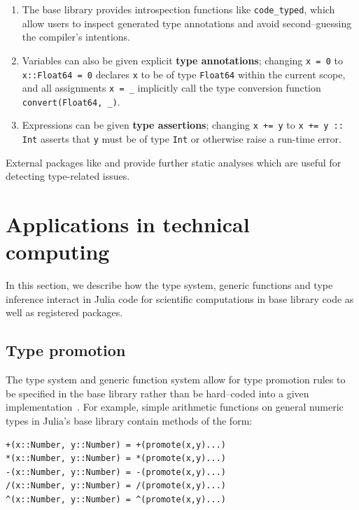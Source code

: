 \documentclass[pldi]{sigplanconf-pldi15}
\begin{document}
\begin{enumerate}

	\item The base library provides introspection functions like
	\verb|code_typed|, which allow users to inspect generated type
	annotations and avoid second--guessing the compiler's intentions.

	\item Variables can also be given explicit \textbf{type annotations};
	changing \verb|x = 0| to \verb|x::Float64 = 0| declares \verb|x| to be
	of type \verb|Float64| within the current scope, and all assignments
	\verb|x = _| implicitly call the type conversion function
	\verb|convert(Float64, _)|.

	\item Expressions can be given \textbf{type assertions}; changing
	\verb|x += y| to \verb|x += y :: Int| asserts that \verb|y| must be of
	type \verb|Int| or otherwise raise a run-time error.

\end{enumerate}
%
External packages like  and  provide
further static analyses which are useful for detecting type-related issues.


\section{Applications in technical computing}

In this section, we describe how the type system, generic functions and type
inference interact in Julia code for scientific computations in base library
code as well as registered packages. 

\subsection{Type promotion}

The type system and generic function system allow for type promotion rules to
be specified in the base library rather than be hard--coded into a given
implementation~\cite{Bezanson2012a}. For example, simple arithmetic functions
on general numeric types in Julia's base library contain methods of the form:

\begin{lstlisting}
+(x::Number, y::Number) = +(promote(x,y)...)
*(x::Number, y::Number) = *(promote(x,y)...)
-(x::Number, y::Number) = -(promote(x,y)...)
/(x::Number, y::Number) = /(promote(x,y)...)
^(x::Number, y::Number) = ^(promote(x,y)...)
\end{lstlisting}
\end{document}
